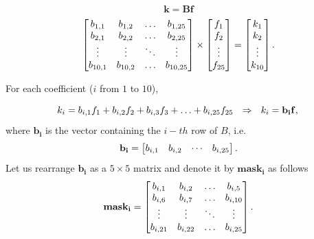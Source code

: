 \documentclass{ipol}
\numberwithin{equation}{section}
\numberwithin{table}{section}
\begin{document}
$$ \mathbf{k} = \mathbf{B}\mathbf{f} $$
%
\begin{equation*}
	\begin{bmatrix}
		b_{1,1}		& b_{1,2}	& \hdots	& b_{1,25}	\\
		b_{2,1}		& b_{2,2}	& \hdots	& b_{2,25}	\\
		\vdots		& \vdots	& \ddots	& \vdots	\\
		b_{10,1}	& b_{10,2}	& \hdots	& b_{10,25}
	\end{bmatrix}
	\times
	\begin{bmatrix}
		f_1		\\
		f_2		\\
		\vdots	\\
		f_{25}
	\end{bmatrix}
	=
	\begin{bmatrix}
		k_1		\\
		k_2		\\
		\vdots	\\
		k_{10}
	\end{bmatrix} .\\
\end{equation*}

For each coefficient ($i$ from $1$ to $10$), 

\begin{equation}
	\label{eq:coefficients}
	k_i = b_{i,1}f_1 + b_{i,2}f_2 + b_{i,3}f_3 + \hdots + b_{i,25}f_{25} \ \ \Rightarrow \ \ k_i = \mathbf{b_i}\mathbf{f} ,\\
\end{equation}
%
where $\mathbf{b_i}$ is the vector containing the $i-th$ row of $B$, i.e.
%
\begin{equation}
	\label{eq:b_i_v}
	\mathbf{b_i} = \begin{bmatrix}	b_{i,1}		& b_{i,2}	& \cdots	& b_{i,25}
					\end{bmatrix}.\\
\end{equation}
%
Let us rearrange $\mathbf{b_i}$ as a $5\times5$ matrix and denote it by $\mathbf{mask_i}$ as follows
\begin{equation}
	\label{eq:b_i}
	\mathbf{mask_i} = \begin{bmatrix}	b_{i,1}		& b_{i,2}	& \hdots	& b_{i,5}	\\
									b_{i,6}		& b_{i,7}	& \hdots	& b_{i,10}	\\
									\vdots		& \vdots	& \ddots	& \vdots	\\
									b_{i,21}	 & b_{i,22}	& \hdots	& b_{i,25}	\\
					\end{bmatrix}.\\
\end{equation}
\end{document}
